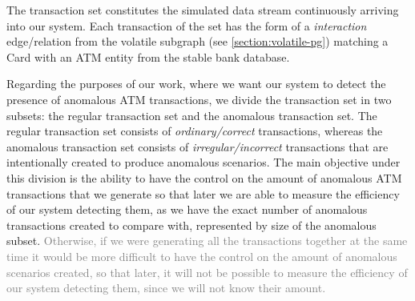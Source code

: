\documentclass{article}
\begin{document}

The transaction set constitutes the simulated data stream continuously arriving into our system. Each transaction of the set has the form of a \emph{interaction} edge/relation from the volatile subgraph (see \ref{section:volatile-pg}) matching a Card with an ATM entity from the stable bank database.

Regarding the purposes of our work, where we want our system to detect the presence of anomalous 
ATM transactions, we divide the transaction set in two subsets: the regular transaction set and the anomalous transaction set. The regular transaction set consists of \emph{ordinary/correct} transactions, whereas the anomalous transaction set consists of \emph{irregular/incorrect} transactions that are intentionally created to produce anomalous scenarios.
The main objective under this division is the ability to have the control on the amount of anomalous ATM transactions that we generate so that later we are able 
to measure the efficiency of our system detecting them, as we have the exact number of anomalous transactions created to compare with, represented by size of the anomalous subset.
\textcolor{gray}{Otherwise, if we were generating all the transactions together at the same time it would be more difficult to have the control on the amount of anomalous scenarios created, so that later, it will not be possible to measure the efficiency of our system detecting them, since we will not know their amount.}
\end{document}
